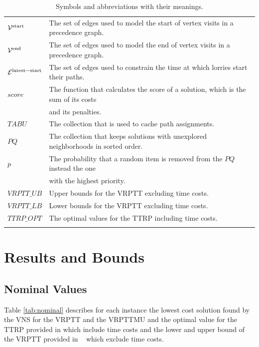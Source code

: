 \begin{longtable}{ll}
$\mathcal V^{\rm start}$ & The set of edges used to model the start of vertex visits in a precedence graph. \\
$\mathcal V^{\rm end}$ & The set of edges used to model the end of vertex visits in a precedence graph. \\
$\mathcal E^{\rm latest-start}$ & The set of edges used to constrain the time at which lorries start their paths. \\
$score$ & The function that calculates the score of a solution, which is the sum of its costs \\
&  and its penalties. \\
$TABU$ & The collection that is used to cache path assignments. \\
$PQ$ & The collection that keeps solutions with unexplored neighborhoods in sorted order. \\
$p$ & The probability that a random item is removed from the $PQ$ instead the one  \\
& with the highest priority. \\
$VRPTT\_UB$ & Upper bounds for the VRPTT excluding time costs. \\
$VRPTT\_LB$ & Lower bounds for the VRPTT excluding time costs. \\
$TTRP\_OPT$ & The optimal values for the TTRP including time costs. \\

\bottomrule
\caption{Symbols and abbreviations with their meanings.}
\label{tab:symbols}
\end{longtable}



\section{Results and Bounds}
\subsection{Nominal Values}
\label{sec:bounds}

Table \ref{tab:nominal} describes for each instance the lowest cost solution found by the VNS for the VRPTT and the VRPTTMU  and  the optimal value for the TTRP provided in \cite{drexl2011branch} which include time costs  and the lower and upper bound of the VRPTT provided in ~\cite{drexl2014bandc} which exclude time costs.




